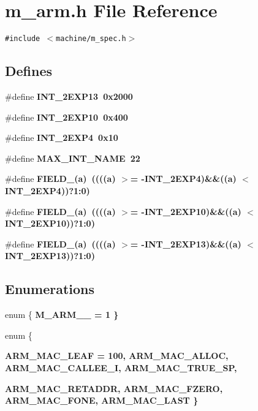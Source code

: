 \section{m\_\-arm.h File Reference}
\label{m__arm_8h}
{\tt \#include $<$machine/m\_\-spec.h$>$}\par
\subsection*{Defines}
\begin{CompactItemize}
\item 
\#define \bf{INT\_\-2EXP13}~0x2000
\item 
\#define \bf{INT\_\-2EXP10}~0x400
\item 
\#define \bf{INT\_\-2EXP4}~0x10
\item 
\#define \bf{MAX\_\-INT\_\-NAME}~22
\item 
\#define \bf{FIELD\_}(a)~((((a) $>$= -INT\_\-2EXP4)\&\&((a) $<$ INT\_\-2EXP4))?1:0)
\item 
\#define \bf{FIELD\_}(a)~((((a) $>$= -INT\_\-2EXP10)\&\&((a) $<$ INT\_\-2EXP10))?1:0)
\item 
\#define \bf{FIELD\_}(a)~((((a) $>$= -INT\_\-2EXP13)\&\&((a) $<$ INT\_\-2EXP13))?1:0)
\end{CompactItemize}
\subsection*{Enumerations}
\begin{CompactItemize}
\item 
enum \{ \bf{M\_\-ARM\_\_} =  1
 \}
\item 
enum \{ \par
\bf{ARM\_\-MAC\_\-LEAF} = 100, 
\bf{ARM\_\-MAC\_\-ALLOC}, 
\bf{ARM\_\-MAC\_\-CALLEE\_\-I}, 
\bf{ARM\_\-MAC\_\-TRUE\_\-SP}, 
\par
\bf{ARM\_\-MAC\_\-RETADDR}, 
\bf{ARM\_\-MAC\_\-FZERO}, 
\bf{ARM\_\-MAC\_\-FONE}, 
\bf{ARM\_\-MAC\_\-LAST}
 \}
\end{CompactItemize}
